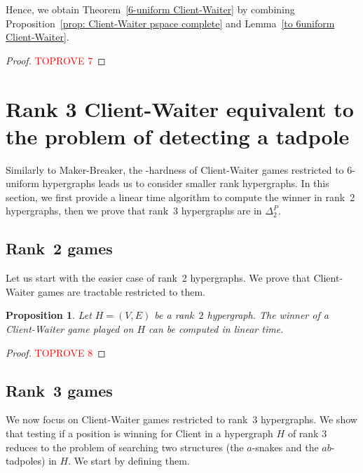 \documentclass{article}
\newcommand{\hyp}{H}
\newcommand{\WS}{E}
\newcommand{\som}{V}
\newcommand{\hxf}{\hyp = (\som, \WS)}
\newtheorem{proposition}[theorem]{Proposition}
\begin{document}
Hence, we obtain Theorem~\ref{6-uniform Client-Waiter} by combining Proposition~\ref{prop: Client-Waiter pspace complete} and Lemma~\ref{to 6uniform Client-Waiter}.

\begin{proof}\textcolor{red}{TOPROVE 7}\end{proof}









\section{Rank 3 Client-Waiter equivalent to the problem of detecting a tadpole} \label{sec: rank3 client-waiter}

Similarly to Maker-Breaker, the \PSPACE-hardness of Client-Waiter games restricted to $6$-uniform hypergraphs leads us to consider smaller rank hypergraphs. In this section, we first provide a linear time algorithm to compute the winner in rank~2 hypergraphs, then we prove that rank~3 hypergraphs are in $\Delta_2^P$.

\subsection{Rank~2 games}

Let us start with the easier case of rank~2 hypergraphs. We prove that Client-Waiter games are tractable restricted to them.

\begin{proposition}\label{prop: rank 2 Client-Waiter}
        Let $\hxf$ be a rank~$2$ hypergraph. The winner of a Client-Waiter game played on $\hyp$ can be computed in linear time.
\end{proposition}

\begin{proof}\textcolor{red}{TOPROVE 8}\end{proof}


\subsection{Rank~3 games}

We now focus on Client-Waiter games restricted to rank~$3$ hypergraphs. We show that testing if a position is winning for Client in a hypergraph \(\hyp\) of rank \(3\) reduces to the problem of searching two structures (the \(a\)-snakes and the \(ab\)-tadpoles) in \(\hyp\). We start by defining them.
\end{document}

